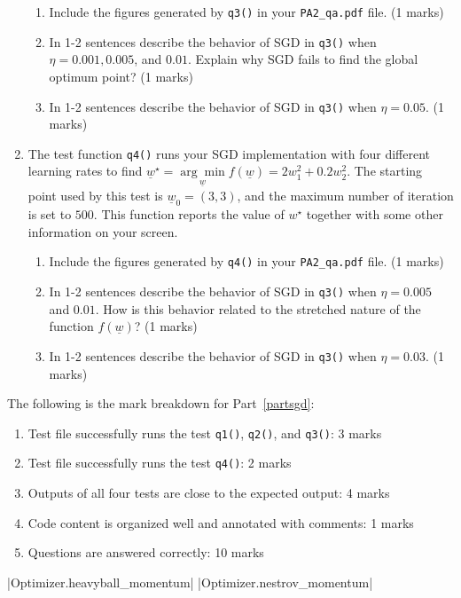 \documentclass{article}
\theoremstyle{definition}
\begin{document}
\begin{enumerate}[label=\ref{partsgd}.\alph*)]
	\begin{enumerate}[label=1.2.c.\roman*)]
		\item Include the figures generated by \verb|q3()| in your \verb|PA2_qa.pdf| file. (1 marks)
		\item In 1-2 sentences describe the behavior of SGD in \verb|q3()| when $\eta=0.001, 0.005$, and $0.01$. Explain why SGD fails to find the global optimum point? (1 marks)
		\item In 1-2 sentences describe the behavior of SGD in \verb|q3()| when $\eta=0.05$. (1 marks)
	\end{enumerate}
	\item The test function \verb|q4()| runs your SGD implementation with four different learning rates to find $\underline{w}^\star = \underset{\underline{w}}{\arg \min} f(\underline{w}) = 2w_1^2 + 0.2w_2^2$. The starting point used by this test is $\underline{w}_0=(3,3)$, and the maximum number of iteration is set to $500$. This function reports the value of $w^\star$ together with some other information on your screen.
	\begin{enumerate}[label=1.2.d.\roman*)]
		\item Include the figures generated by \verb|q4()| in your \verb|PA2_qa.pdf| file. (1 marks)
		\item In 1-2 sentences describe the behavior of SGD in \verb|q3()| when $\eta=0.005$ and $0.01$. How is this behavior related to the stretched nature of the function $f(\underline{w})$? (1 marks)
		\item In 1-2 sentences describe the behavior of SGD in \verb|q3()| when $\eta=0.03$. (1 marks)
	\end{enumerate}
\end{enumerate}
The following is the mark breakdown for Part~\ref{partsgd}:
\begin{enumerate}[label=(\roman*)]
	\item Test file successfully runs the test \verb|q1()|, \verb|q2()|, and \verb|q3()|: 3 marks
	\item Test file successfully runs the test \verb|q4()|: 2 marks
	\item Outputs of all four tests are close to the expected output: 4 marks
	\item Code content is organized well and annotated with comments: 1 marks
	\item Questions are answered correctly: 10 marks
\end{enumerate}

|Optimizer.heavyball_momentum|
|Optimizer.nestrov_momentum|
\end{document}
